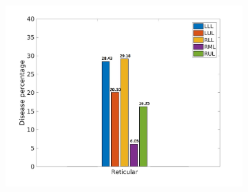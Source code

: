 \begin{figure}[H]
\begin{subfigure}{.46\linewidth}
  \includegraphics[width=\linewidth,trim={{.0\wd0} {.0\wd0} {.0\wd0} {.0\wd0}},clip]{QuantitativeAnalysis/Image/ReticularLobarRegionDiseaseDistribution.jpg}
  \caption{}
  \label{fig:LobarRegionDiseaseDistribution-b}
\end{subfigure}
\begin{subfigure}{.46\linewidth}%

\end{subfigure}
\end{figure}
